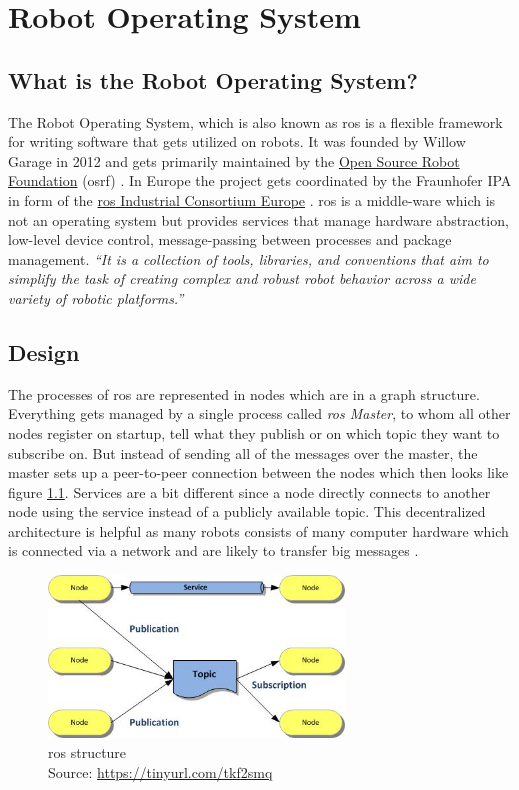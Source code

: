 
\chapter{Robot Operating System\authorA} \label{ref:ros}

\section{What is the Robot Operating System?}
The Robot Operating System, which is also known as \gls{ros} is a flexible framework for writing software that gets utilized on robots. It was founded by Willow Garage in 2012 and gets primarily maintained by the \href{https://www.openrobotics.org/}{Open Source Robot Foundation} (\gls{osrf}) \cite{osrf}. In Europe the project gets coordinated by the Fraunhofer IPA in form of the \href{https://rosindustrial.org/ric-eu}{\gls{ros} Industrial Consortium Europe} \cite{rosice}. \gls{ros} is a middle-ware which is not an operating system but provides services that manage hardware abstraction, low-level device control, message-passing between processes and package management. \emph{\enquote{It is a collection of tools, libraries, and conventions that aim to simplify the task of creating complex and robust robot behavior across a wide variety of robotic platforms.}} \cite{aboutros}

\section{Design}
The processes of \gls{ros} are represented in nodes which are in a graph structure. Everything gets managed by a single process called \textit{\gls{ros} Master}, to whom all other nodes register on startup, tell what they publish or on which topic they want to subscribe on. But instead of sending all of the messages over the master, the master sets up a peer-to-peer connection between the nodes which then looks like figure \ref{rosstructure}. Services are a bit different since a node directly connects to another node using the service instead of a publicly available topic. This decentralized architecture is helpful as many robots consists of many computer hardware which is connected via a network and are likely to transfer big messages \cite{rosoneoone}. \newline
\begin{figure}[h]
	\centering
	\includegraphics[width=0.7\textwidth]{./media/images/ros_structure.jpg}
  	\caption{\gls{ros} structure
  	\\Source: \url{https://tinyurl.com/tkf2smq}}
  	\label{rosstructure}
\end{figure}


